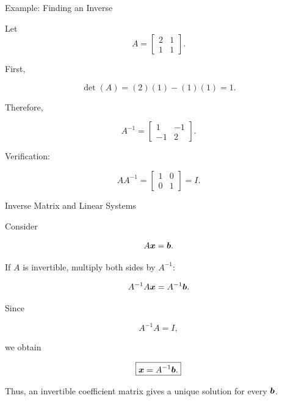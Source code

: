 
\begin{frame}{Example: Finding an Inverse}

Let
\vspace{-0.1cm}
\[
A=
\begin{bmatrix}
2&1\\
1&1
\end{bmatrix}.
\]

First,

\[
\det(A)
=
(2)(1)-(1)(1)
=
1.
\]

Therefore,

\[
A^{-1}
=
\begin{bmatrix}
1&-1\\
-1&2
\end{bmatrix}.
\]

Verification:

\[
AA^{-1}
=
\begin{bmatrix}
1&0\\
0&1
\end{bmatrix}
=
I.
\]

\end{frame}



\begin{frame}{Inverse Matrix and Linear Systems}

Consider

\[
A\bm{x}=\bm{b}.
\]

If $A$ is invertible, multiply both sides by $A^{-1}$:

\[
A^{-1}A\bm{x}
=
A^{-1}\bm{b}.
\]

Since

\[
A^{-1}A=I,
\]

we obtain

\[
\boxed{
\bm{x}=A^{-1}\bm{b}.
}
\]

Thus, an invertible coefficient matrix gives a unique solution
for every $\bm{b}$.

\end{frame}



